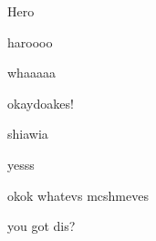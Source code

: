 \begin{theorem}
  Hero
\end{theorem}

\begin{theorem}
  haroooo
\end{theorem}

\begin{remark}
  whaaaaa
\end{remark}

\begin{remark}
  okaydoakes!
\end{remark}

\begin{definition}
  shiawia
\end{definition}

\begin{theorem}
  yesss
\end{theorem}

\begin{corollary}
  okok whatevs mcshmeves
\end{corollary}

\begin{cremark}
  you got dis?
\end{cremark}

